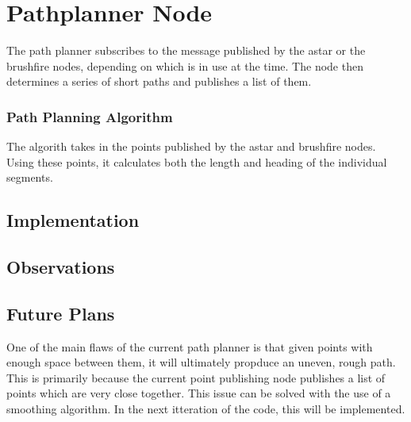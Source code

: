 \section{Pathplanner Node}

The path planner subscribes to the message published by the astar or the brushfire nodes, depending on which is in use at the time. The node then determines a series of short paths and publishes a list of them.

\subsubsection{Path Planning Algorithm}
The algorith takes in the points published by the astar and brushfire nodes. Using these points, it calculates both the length and heading of the individual segments.

\subsection{Implementation}


\subsection{Observations}


\subsection{Future Plans}
One of the main flaws of the current path planner is that given points with enough space between them, it will ultimately propduce an uneven, rough path. This is primarily because the current point publishing node publishes a list of points which are very close together. This issue can be solved with the use of a smoothing algorithm. In the next itteration of the code, this will be implemented.
